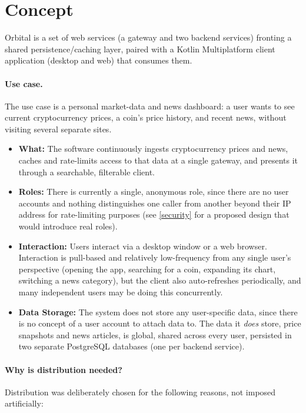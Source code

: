 \documentclass{scrartcl}
\begin{document}
\tableofcontents

\section{Concept}\label{concept}

Orbital is a set of web services (a gateway and two backend services) fronting a shared
persistence/caching layer, paired with a Kotlin Multiplatform client application (desktop and
web) that consumes them.

\paragraph{Use case.} The use case is a personal market-data and news dashboard: a user wants to
see current cryptocurrency prices, a coin's price history, and recent news, without visiting
several separate sites.

\begin{itemize}
  \item \textbf{What:} The software continuously ingests cryptocurrency prices and news, caches
  and rate-limits access to that data at a single gateway, and presents it through a searchable,
  filterable client.
  \item \textbf{Roles:} There is currently a single, anonymous role, since there are no user
  accounts and nothing distinguishes one caller from another beyond their IP address for
  rate-limiting purposes (see \cref{security} for a proposed design that would introduce real
  roles).
  \item \textbf{Interaction:} Users interact via a desktop window or a web browser. Interaction is
  pull-based and relatively low-frequency from any single user's perspective (opening the app,
  searching for a coin, expanding its chart, switching a news category), but the client also
  auto-refreshes periodically, and many independent users may be doing this concurrently.
  \item \textbf{Data Storage:} The system does not store any user-specific data, since there is no
  concept of a user account to attach data to. The data it \emph{does} store, price snapshots and
  news articles, is global, shared across every user, persisted in two separate PostgreSQL
  databases (one per backend service).
\end{itemize}

\paragraph{Why is distribution needed?} Distribution was deliberately chosen for the following
reasons, not imposed artificially:
\end{document}
